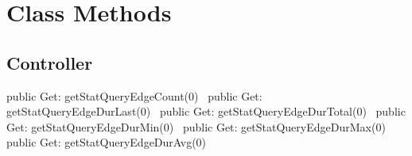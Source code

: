 \section{Class Methods}
\subsection{Controller}
\nwenddocs{}\plusendmoddef
public \LA{}Get: getStatQueryEdgeCount(0)~{\nwtagstyle{}}\RA{}
public \LA{}Get: getStatQueryEdgeDurLast(0)~{\nwtagstyle{}}\RA{}
public \LA{}Get: getStatQueryEdgeDurTotal(0)~{\nwtagstyle{}}\RA{}
public \LA{}Get: getStatQueryEdgeDurMin(0)~{\nwtagstyle{}}\RA{}
public \LA{}Get: getStatQueryEdgeDurMax(0)~{\nwtagstyle{}}\RA{}
public \LA{}Get: getStatQueryEdgeDurAvg(0)~{\nwtagstyle{}}\RA{}
\nwendcode{}\nwdocspar

